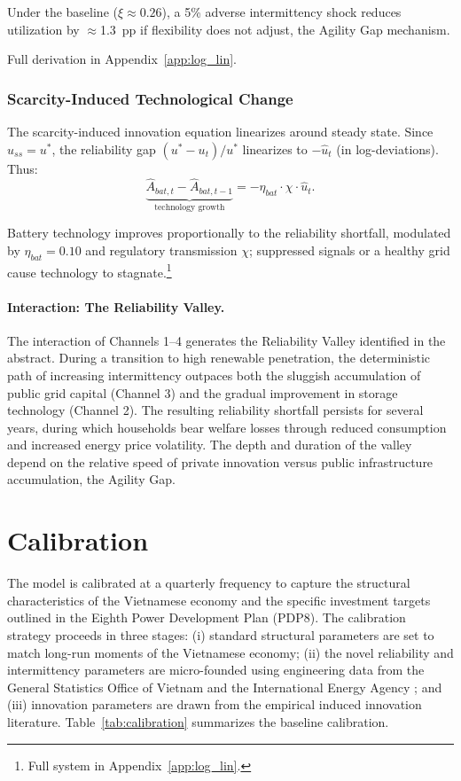 	Under the baseline ($\xi \approx 0.26$), a 5\% adverse intermittency shock reduces utilization by $\approx$1.3~pp if flexibility does not adjust, the Agility Gap mechanism.	

	\noindent Full derivation in Appendix~\ref{app:log_lin}.

\subsubsection{Scarcity-Induced Technological Change}
The scarcity-induced innovation equation linearizes around steady state. Since $u_{ss} = u^*$, the reliability gap $(u^* - u_t)/u^*$ linearizes to $-\hat{u}_t$ (in log-deviations). Thus:
	\begin{equation}
		\underbrace{\hat{A}_{bat,t} - \hat{A}_{bat,t-1}}_{\text{technology growth}} = -\eta_{bat} \cdot \chi \cdot \hat{u}_t
		\label{eq:abat_lin}.
	\end{equation}
	
	Battery technology improves proportionally to the reliability shortfall, modulated by $\eta_{bat}=0.10$ and regulatory transmission $\chi$; suppressed signals or a healthy grid cause technology to stagnate.\footnote{Full system in Appendix~\ref{app:log_lin}.}

	\paragraph{Interaction: The Reliability Valley.}
	The interaction of Channels 1--4 generates the Reliability Valley identified in the abstract. During a transition to high renewable penetration, the deterministic path of increasing intermittency outpaces both the sluggish accumulation of public grid capital (Channel 3) and the gradual improvement in storage technology (Channel 2). The resulting reliability shortfall persists for several years, during which households bear welfare losses through reduced consumption and increased energy price volatility. The depth and duration of the valley depend on the relative speed of private innovation versus public infrastructure accumulation, the Agility Gap.
	
	
	\section{Calibration} \label{sec:calibration}
	
	The model is calibrated at a quarterly frequency to capture the structural characteristics of the Vietnamese economy and the specific investment targets outlined in the Eighth Power Development Plan (PDP8). The calibration strategy proceeds in three stages: (i) standard structural parameters are set to match long-run moments of the Vietnamese economy; (ii) the novel reliability and intermittency parameters are micro-founded using engineering data from the General Statistics Office of Vietnam \citep{gso2024} and the International Energy Agency \citep{iea2023}; and (iii) innovation parameters are drawn from the empirical induced innovation literature. Table~\ref{tab:calibration} summarizes the baseline calibration.
	
